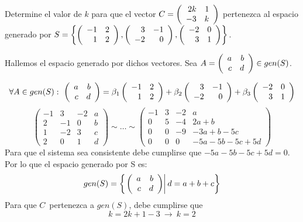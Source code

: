 \begin{ejercicio}
Determine el valor de $k$ para que el vector $C= \left( \begin{array}{rr} 2k&1\\ -3&k \end{array} \right) $ pertenezca al espacio generado por $S=\left\{ \left( \begin{array}{rr} -1&2\\ 1&2 \end{array} \right) ,  \left( \begin{array}{rr} 3&-1\\ -2&0 \end{array} \right) ,  \left( \begin{array}{rr} -2&0\\ 3&1 \end{array} \right) \right\}$.
\end{ejercicio}
Hallemos el espacio generado por dichos vectores. Sea $A= \left( \begin{array}{rr} a&b\\ c&d \end{array} \right)  \in gen(S)$.

\[\forall A\in gen(S):\ 
\matrdxd{a&b}{c&d}=
\beta_1\matrdxd{-1&2}{1&2}+ \beta_2\matrdxd{3&-1}{-2&0}+ \beta_3\matrdxd{-2&0}{3&1}
\]
\[
\left(
\begin{array}{rrr|r}
-1&3&-2&a\\
2&-1&0&b\\
1&-2&3&c\\
2&0&1&d
\end{array}
\right)
\sim
\ldots
\sim
\left(
\begin{array}{rrr|r}
-1&3&-2&a\\
0&5&-4&2a+b\\
0&0&-9&-3a+b-5c\\
0&0&0&-5a-5b-5c+5d
\end{array}
\right)
\]
Para que el sistema sea consistente debe cumplirse que $-5a-5b-5c+5d=0$. Por lo que el espacio generado por S es:
\[gen(S)=\left\{ \left. 
 \left( \begin{array}{rr} a&b\\ c&d \end{array} \right) 
\right| d=a+b+c \right\}
\]
Para que $C$\ pertenezca a $gen(S)$, debe cumplirse que
\[k=2k+1-3\ \rightarrow\ k=2\]





